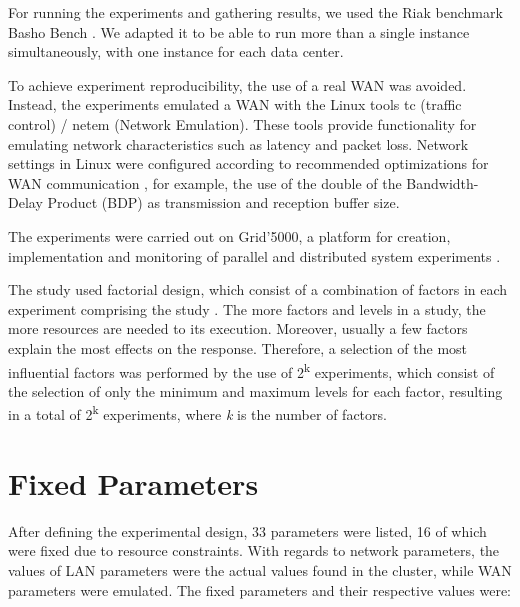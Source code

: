 \documentclass[doublespacing]{bmcart}
\begin{document}
For running the experiments and gathering results, we used the Riak benchmark
Basho Bench \cite{BashoBench2013}. We adapted it to be able to run more than a
single instance simultaneously, with one instance for each data center.

To achieve experiment reproducibility, the use of a real WAN was avoided.
Instead, the experiments emulated a WAN with the Linux tools tc (traffic
control) / netem (Network Emulation). These tools provide functionality for
emulating network characteristics such as latency and packet loss. Network
settings in Linux were configured according to recommended optimizations for
WAN communication \cite{ESnet2012}, for example, the use of the double of the
Bandwidth-Delay Product (BDP) as transmission and reception buffer size.

The experiments were carried out on Grid'5000, a platform for creation,
implementation and monitoring of parallel and distributed system experiments
\cite{Grid50002013}.

The study used factorial design, which consist of a combination of factors in
each experiment comprising the study \cite{Jain1991}. The more factors and
levels in a study, the more resources are needed to its execution.  Moreover,
usually a few factors explain the most effects on the response. Therefore, a
selection of the most influential factors was performed by the use of
2\textsuperscript{k} experiments, which consist of the selection of only the
minimum and maximum levels for each factor, resulting in a total of
2\textsuperscript{k} experiments, where \textit{k} is the number of factors.

\section{Fixed Parameters}

After defining the experimental design, 33 parameters were listed, 16 of which
were fixed due to resource constraints. With regards to network parameters, the
values of LAN parameters were the actual values found in the cluster, while WAN
parameters were emulated. The fixed parameters and their respective values
were:
\end{document}
